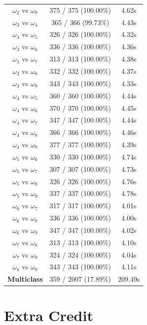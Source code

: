 \documentclass{article}
\begin{document}
\begin{center}
\begin{tabular}{|c|c|c|}
$\omega_2$ vs $\omega_9$ & 375 / 375 (100.00\%) & 4.62s \\
$\omega_3$ vs $\omega_4$ & 365 / 366 (99.73\%) & 4.43s \\
$\omega_3$ vs $\omega_5$ & 326 / 326 (100.00\%) & 4.32s \\
$\omega_3$ vs $\omega_6$ & 336 / 336 (100.00\%) & 4.36s \\
$\omega_3$ vs $\omega_7$ & 313 / 313 (100.00\%) & 4.38s \\
$\omega_3$ vs $\omega_8$ & 332 / 332 (100.00\%) & 4.37s \\
$\omega_3$ vs $\omega_9$ & 343 / 343 (100.00\%) & 4.33s \\
$\omega_4$ vs $\omega_5$ & 360 / 360 (100.00\%) & 4.44s \\
$\omega_4$ vs $\omega_6$ & 370 / 370 (100.00\%) & 4.45s \\
$\omega_4$ vs $\omega_7$ & 347 / 347 (100.00\%) & 4.44s \\
$\omega_4$ vs $\omega_8$ & 366 / 366 (100.00\%) & 4.46s \\
$\omega_4$ vs $\omega_9$ & 377 / 377 (100.00\%) & 4.39s \\
$\omega_5$ vs $\omega_6$ & 330 / 330 (100.00\%) & 4.74s \\
$\omega_5$ vs $\omega_7$ & 307 / 307 (100.00\%) & 4.73s \\
$\omega_5$ vs $\omega_8$ & 326 / 326 (100.00\%) & 4.76s \\
$\omega_5$ vs $\omega_9$ & 337 / 337 (100.00\%) & 4.78s \\
$\omega_6$ vs $\omega_7$ & 317 / 317 (100.00\%) & 4.01s \\
$\omega_6$ vs $\omega_8$ & 336 / 336 (100.00\%) & 4.00s \\
$\omega_6$ vs $\omega_9$ & 347 / 347 (100.00\%) & 4.02s \\
$\omega_7$ vs $\omega_8$ & 313 / 313 (100.00\%) & 4.10s \\
$\omega_7$ vs $\omega_9$ & 324 / 324 (100.00\%) & 4.04s \\
$\omega_8$ vs $\omega_9$ & 343 / 343 (100.00\%) & 4.11s \\ \hline
{\bf Multiclass} & 359 / 2007 (17.89\%)  & 209.49s\\ \hline
\end{tabular}
\end{center}



\section{Extra Credit}
\end{document}
